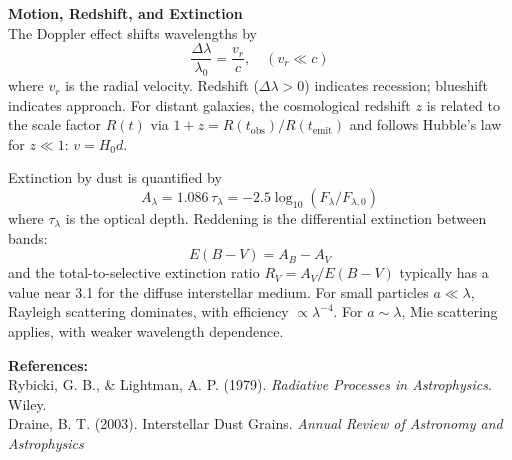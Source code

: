 \begin{technical}
\noindent\textbf{Motion, Redshift, and Extinction}\\[0.2em]
The Doppler effect shifts wavelengths by
\[
\frac{\Delta \lambda}{\lambda_0} = \frac{v_r}{c}, \quad (v_r \ll c)
\]
where \( v_r \) is the radial velocity. Redshift (\( \Delta \lambda > 0 \)) indicates recession; blueshift indicates approach. For distant galaxies, the cosmological redshift \( z \) is related to the scale factor \( R(t) \) via $1 + z = R(t_{\text{obs}})/R(t_{\text{emit}})$ and follows Hubble's law for \( z \ll 1 \): \( v = H_0 d \).

Extinction by dust is quantified by
\[
A_\lambda = 1.086\, \tau_\lambda = -2.5 \log_{10} \left( {F_\lambda}/{F_{\lambda,0}} \right)
\]
where \( \tau_\lambda \) is the optical depth. Reddening is the differential extinction between bands:
\[
E(B - V) = A_B - A_V
\]
and the total-to-selective extinction ratio \( R_V = A_V / E(B - V) \) typically has a value near 3.1 for the diffuse interstellar medium. For small particles \( a \ll \lambda \), Rayleigh scattering dominates, with efficiency \( \propto \lambda^{-4} \). For \( a \sim \lambda \), Mie scattering applies, with weaker wavelength dependence.

\vspace{0.5em}
\noindent\textbf{References:}\\
Rybicki, G. B., \& Lightman, A. P. (1979). \textit{Radiative Processes in Astrophysics}. Wiley.\\
Draine, B. T. (2003). Interstellar Dust Grains. \textit{Annual Review of Astronomy and Astrophysics}
\end{technical}

